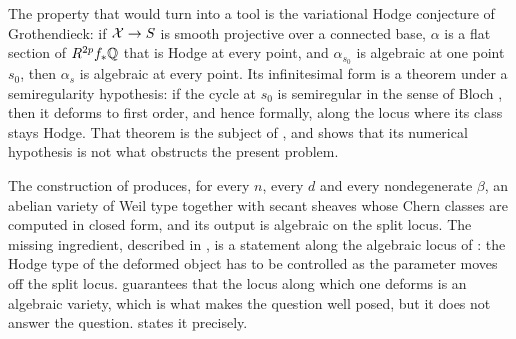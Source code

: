 \begin{remark}\label{rem:variational}
The property that would turn  into a tool is the variational
Hodge conjecture of Grothendieck: if $\mathcal{X}\to S$ is smooth projective over a
connected base, $\alpha$ is a flat section of $R^{2p}f_{*}\mathbb{Q}$ that is Hodge at
every point, and $\alpha_{s_{0}}$ is algebraic at one point $s_{0}$, then
$\alpha_{s}$ is algebraic at every point. Its infinitesimal form is a
theorem under a semiregularity hypothesis: if the cycle at
$s_{0}$ is semiregular in the sense of Bloch \cite{Blo72}, then it deforms to
first order, and hence formally, along the locus where its class stays Hodge.
That theorem is the subject of , and
 shows that its numerical hypothesis is not what
obstructs the present problem.
\end{remark}

\begin{remark}\label{rem:cdkconstruction}
The construction of  produces, for every $n$, every $d$
and every nondegenerate $\beta$, an abelian variety of Weil type together with
secant sheaves whose Chern classes are computed in closed form, and its output
is algebraic on the split locus. The missing ingredient, described in
, is a statement along the algebraic locus of
: the Hodge type of the deformed object has to be
controlled as the parameter moves off the split locus. 
guarantees that the locus along which one deforms is an algebraic variety,
which is what makes the question well posed, but it does not answer the
question.  states it precisely.
\end{remark}
